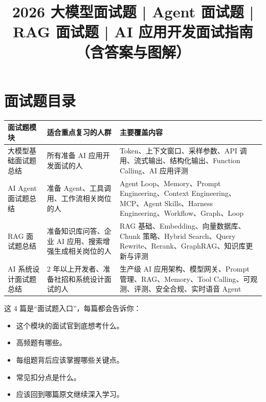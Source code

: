 \documentclass[9pt,a4paper,twocolumn]{ctexart}
\begin{document}
\title{2026 大模型面试题 | Agent 面试题 | RAG 面试题 | AI 应用开发面试指南（含答案与图解）}
\date{}
\maketitle
{}

\section*{面试题目录}

{\footnotesize
\begin{tabular}{|p{}|p{}|p{}|}
\hline
\textbf{面试题模块} & \textbf{适合重点复习的人群} & \textbf{主要覆盖内容} \\
\hline
大模型基础面试题总结 & 所有准备 AI 应用开发面试的人 & Token、上下文窗口、采样参数、API 调用、流式输出、结构化输出、Function Calling、AI 应用评测 \\
\hline
AI Agent 面试题总结 & 准备 Agent、工具调用、工作流相关岗位的人 & Agent Loop、Memory、Prompt Engineering、Context Engineering、MCP、Agent Skills、Harness Engineering、Workflow、Graph、Loop \\
\hline
RAG 面试题总结 & 准备知识库问答、企业 AI 应用、搜索增强生成相关岗位的人 & RAG 基础、Embedding、向量数据库、Chunk 策略、Hybrid Search、Query Rewrite、Rerank、GraphRAG、知识库更新与评测 \\
\hline
AI 系统设计面试题总结 & 2 年以上开发者、准备社招和系统设计面试的人 & 生产级 AI 应用架构、模型网关、Prompt 管理、RAG、Memory、Tool Calling、可观测、评测、安全合规、实时语音 Agent \\
\hline
\end{tabular}
}



这 4 篇是“面试题入口”，每篇都会告诉你：


\begin{itemize}[itemsep=1pt, topsep=2pt]
  \item 这个模块的面试官到底想考什么。
  \item 高频题有哪些。
  \item 每组题背后应该掌握哪些关键点。
  \item 常见扣分点是什么。
  \item 应该回到哪篇原文继续深入学习。
\end{itemize}
\end{document}
